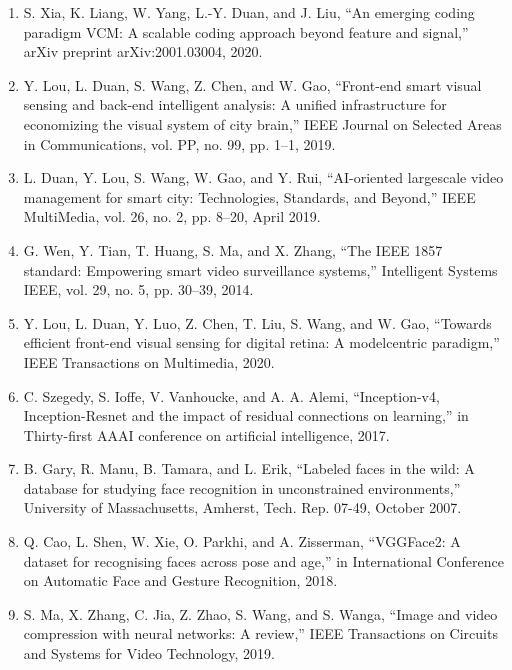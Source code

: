 \documentclass{article}
\begin{document}
\begin{enumerate}
	\item S. Xia, K. Liang, W. Yang, L.-Y. Duan, and J. Liu, “An emerging coding
	paradigm VCM: A scalable coding approach beyond feature and signal,”
	arXiv preprint arXiv:2001.03004, 2020.

	\item Y. Lou, L. Duan, S. Wang, Z. Chen, and W. Gao, “Front-end smart visual
	sensing and back-end intelligent analysis: A unified infrastructure for
	economizing the visual system of city brain,” IEEE Journal on Selected
	Areas in Communications, vol. PP, no. 99, pp. 1–1, 2019.

	\item L. Duan, Y. Lou, S. Wang, W. Gao, and Y. Rui, “AI-oriented largescale video management for smart city: Technologies, Standards, and
	Beyond,” IEEE MultiMedia, vol. 26, no. 2, pp. 8–20, April 2019.

	\item G. Wen, Y. Tian, T. Huang, S. Ma, and X. Zhang, “The IEEE 1857
	standard: Empowering smart video surveillance systems,” Intelligent
	Systems IEEE, vol. 29, no. 5, pp. 30–39, 2014.

	\item Y. Lou, L. Duan, Y. Luo, Z. Chen, T. Liu, S. Wang, and W. Gao,
	“Towards efficient front-end visual sensing for digital retina: A modelcentric paradigm,” IEEE Transactions on Multimedia, 2020.

	\item C. Szegedy, S. Ioffe, V. Vanhoucke, and A. A. Alemi, “Inception-v4,
	Inception-Resnet and the impact of residual connections on learning,”
	in Thirty-first AAAI conference on artificial intelligence, 2017.

	\item B. Gary, R. Manu, B. Tamara, and L. Erik, “Labeled faces in the wild: A
	database for studying face recognition in unconstrained environments,”
	University of Massachusetts, Amherst, Tech. Rep. 07-49, October 2007.

	\item Q. Cao, L. Shen, W. Xie, O. Parkhi, and A. Zisserman, “VGGFace2:
	A dataset for recognising faces across pose and age,” in International
	Conference on Automatic Face and Gesture Recognition, 2018.

	\item S. Ma, X. Zhang, C. Jia, Z. Zhao, S. Wang, and S. Wanga, “Image and
	video compression with neural networks: A review,” IEEE Transactions
	on Circuits and Systems for Video Technology, 2019.


\end{enumerate}
\end{document}
